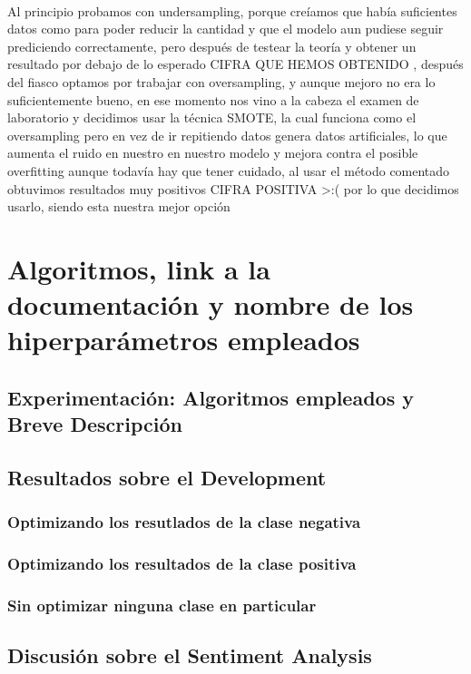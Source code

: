 \documentclass{report}
\begin{document}
                \paragraph{}{Al principio probamos con undersampling, porque creíamos que había suficientes datos como para poder reducir la cantidad y que el modelo aun pudiese seguir prediciendo correctamente, pero después de testear la teoría y obtener un resultado por debajo de lo esperado \color{red} {CIFRA QUE HEMOS OBTENIDO} \color{black}, después del fiasco optamos por trabajar con oversampling, y aunque mejoro no era lo suficientemente bueno, en ese momento nos vino a la cabeza el examen de laboratorio y decidimos usar la técnica SMOTE, la cual funciona como el oversampling pero en vez de ir repitiendo datos genera datos artificiales, lo que aumenta el ruido en nuestro en nuestro modelo y mejora contra el posible overfitting aunque todavía hay que tener cuidado, al usar el método comentado obtuvimos resultados muy positivos \color{green} CIFRA POSITIVA >:( \color{black} por lo que decidimos usarlo, siendo esta nuestra mejor opción}
        \section{Algoritmos, link a la documentación y nombre de los hiperparámetros empleados}
            \subsection{Experimentación: Algoritmos empleados y Breve Descripción}
            \subsection{Resultados sobre el Development}
                \subsubsection{Optimizando los resutlados de la clase negativa}
                \subsubsection{Optimizando los resultados de la clase positiva}
                \subsubsection{Sin optimizar ninguna clase en particular}
            \subsection{Discusión sobre el Sentiment Analysis}
\end{document}
